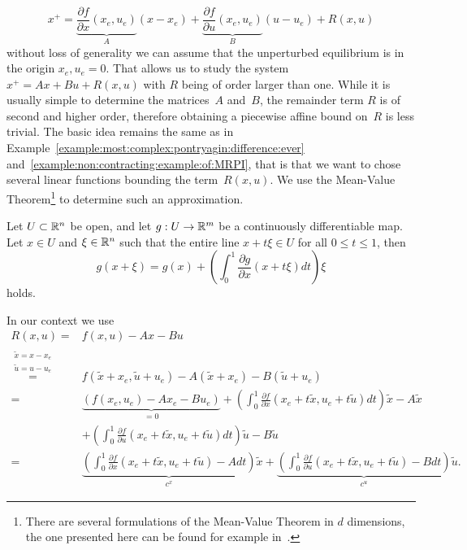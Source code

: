 %
\begin{equation}
	x^+ = \underbrace{\frac{\partial f}{\partial x}(x_e,u_e)}_A (x-x_e) + \underbrace{\frac{\partial f}{\partial u}(x_e,u_e)}_B (u-u_e) + R(x,u)
\end{equation}
%
without loss of generality we can assume that the unperturbed equilibrium is in the origin $x_e,u_e=0$.
%
That allows us to study the system~$x^+ = Ax+Bu+R(x,u)$ with $R$ being of order larger than one.
%
While it is usually simple to determine the matrices~$A$ and~$B$, the remainder term $R$ is of second and higher order, therefore obtaining a piecewise affine bound on~$R$ is less trivial.
%
The basic idea remains the same as in Example~\ref{example:most:complex:pontryagin:difference:ever} and~\ref{example:non:contracting:example:of:MRPI}, that is that we want to chose several linear functions bounding the term~$R(x,u)$.
%
We use the Mean-Value Theorem\footnote{
	There are several formulations of the Mean-Value Theorem in $d$ dimensions, the one presented here can be found for example in~\cite{Forster:2008}.
} to determine such an approximation.
%
\begin{thm}\label{thm:mean:value:theorem}
Let $U\subset\mathbb R^n$ be open, and let $g: U\rightarrow\mathbb R^m$ be a continuously differentiable map.
%
Let $x\in U$ and $\xi\in\mathbb R^n$ such that the entire line $x+t\xi\in U$ for all $0\leq t\leq 1$, then
%
\begin{equation}
	g(x+\xi) = g(x) + \left(\int_0^1\frac{\partial g}{\partial x}(x+t\xi)dt\right)\xi
\end{equation}
%
holds.
\end{thm}
%
\noindent In our context we use
%
\begin{equation}
	\begin{aligned}
	R(x,u) =& f(x,u) - Ax-Bu\\
	\overset{\substack{\tilde x = x-x_e\\ \tilde u = u-u_e}}{=}& f(\tilde x + x_e,\tilde u+u_e) - A(\tilde x+x_e) - B(\tilde u+u_e)\\
	=& \underbrace{(f(x_e,u_e)-Ax_e-Bu_e)}_{=0} + \left(\int_0^1 \frac{\partial f}{\partial x}(x_e+t\tilde x,u_e+t\tilde u)dt\right)\tilde x -A\tilde x \\
	&+ \left(\int_0^1 \frac{\partial f}{\partial u}(x_e+t\tilde x,u_e+t\tilde u)dt\right)\tilde u-B\tilde u\\
	= & \underbrace{\left(\int_0^1 \frac{\partial f}{\partial x}(x_e+t\tilde x,u_e+t\tilde u)-A dt\right)}_{c^x}\tilde x + 
	\underbrace{\left(\int_0^1 \frac{\partial f}{\partial u}(x_e+t\tilde x,u_e+t\tilde u)-B dt\right)}_{c^u}\tilde u.
	\end{aligned}
\end{equation}
